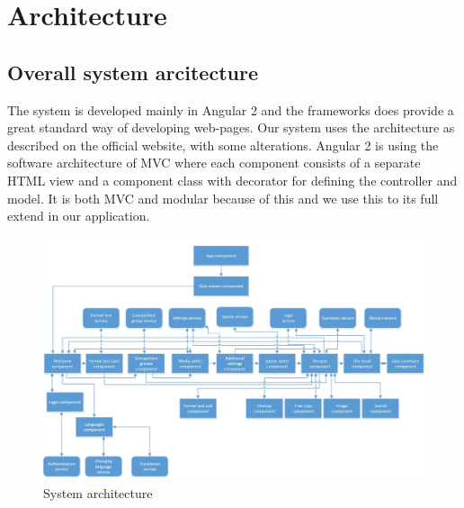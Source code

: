 \chapter{Architecture}
\label{chap:architecture}


\section{Overall system arcitecture}
\label{sec:overallArc}
The system is developed mainly in Angular 2\cite{Angular2:online} and the frameworks does provide a great standard way of developing web-pages. Our system uses the architecture as described on the official website, with some alterations. Angular 2 is using the software architecture of MVC \cite{Angular2:online} where each component consists of a separate HTML view and a component class with decorator for defining the controller and model. It is both MVC and modular because of this and we use this to its full extend in our application. 


\begin{figure}[h]
  \centering
  \includegraphics[width=1.0\textwidth]{figures/system_architecture.jpg}
  \caption[Hierarchy]{System architecture}
  \label{fig:Hierarchy}
\end{figure}

